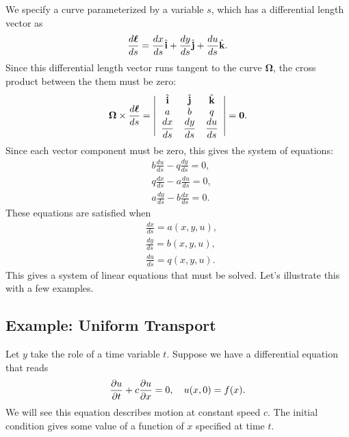 We specify a curve parameterized by a variable $s$, which has a differential length vector as
\begin{align}
  \frac{d\boldsymbol\ell}{ds} = \frac{dx}{ds} \hat{\mathbf{i}} + \frac{dy}{ds} \hat{\mathbf{j}} + \frac{du}{ds} \hat{\mathbf{k}} .
\end{align}
Since this differential length vector runs tangent to the curve $\boldsymbol\Omega$, the cross product between the them must be zero:
\begin{align}
  \boldsymbol\Omega \times \frac{d\boldsymbol\ell}{ds} = 
  \left| \begin{array}{c c c} 
  \hat{\mathbf{i}} & \hat{\mathbf{j}} & \hat{\mathbf{k}} \\
  a & b & q \\
  \dfrac{dx}{ds} & \dfrac{dy}{ds} & \dfrac{du}{ds} \\ \end{array} \right| = \mathbf{0} .
\end{align}
Since each vector component must be zero, this gives the system of equations:
\begin{subequations}
\begin{align}
  &b \frac{du}{ds} - q \frac{dy}{ds} = 0, \\
  &q \frac{dx}{ds} - a \frac{du}{ds} = 0, \\
  &a \frac{dy}{ds} - b \frac{dx}{ds} = 0.
\end{align}
\end{subequations}
These equations are satisfied when
\begin{subequations}
\begin{align}
  &\frac{dx}{ds} = a(x,y,u), \\
  &\frac{dy}{ds} = b(x,y,u), \\
  &\frac{du}{ds} = q(x,y,u) .
\end{align}
\end{subequations}
This gives a system of linear equations that must be solved. Let's illustrate this with a few examples.

\subsection{Example: Uniform Transport}

Let $y$ take the role of a time variable $t$. Suppose we have a differential equation that reads
\begin{align}
  \frac{ \partial {u} }{ \partial {t} } + c \frac{ \partial {u} }{ \partial {x} } = 0, \quad u(x,0) = f(x).
\end{align}
We will see this equation describes motion at constant speed $c$. The initial condition gives some value of a function of $x$ specified at time $t$.

